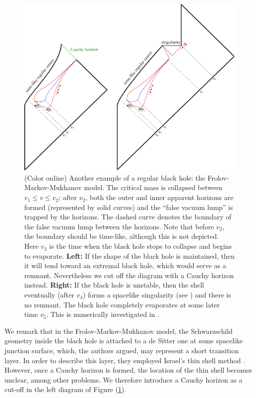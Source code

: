 \documentclass[12pt]{article}
\newcommand{\2}{$^2$}
\newcommand{\3}{$^3$}
\newcommand{\4}{$_4$}
\newcommand{\5}{$_5$}
\begin{document}
\begin{figure}
\begin{center}
\includegraphics[scale=0.48]{regular_3-eps-converted-to.pdf}
\caption{ \label{fig:regular} (Color online) Another example of a regular black hole: the Frolov-Markov-Mukhanov model. The critical mass is collapsed between $v_{1} \leqslant v \leqslant v_{2}$; after $v_{2}$, both the outer and inner apparent horizons are formed (represented by solid curves) and the ``false vacuum lump'' is trapped by the horizons. The dashed curve denotes the boundary of the false vacuum lump between the  horizons. Note that before $v_{2}$, the boundary should be time-like, although this is not depicted.  Here $v_{3}$ is the time when the black hole stops to collapse and begins to evaporate. \textbf{Left:} If the shape of the black hole is maintained, then it will tend toward an extremal black hole, which would serve as a remnant. Nevertheless we cut off the diagram with a Cauchy horizon instead. \textbf{Right:} If the black hole is unstable, then the shell eventually (after $v_{4}$) forms a spacelike singularity (see \cite{Yeom:2008qw1}) and there is no remnant. The black hole completely evaporates at some later time $v_5$. This is numerically investigated in \cite{Hwang:2012nn}.}
\end{center}
\end{figure}


We remark that in the Frolov-Markov-Mukhanov model, the Schwarzschild geometry inside the black hole is attached to a de Sitter one at some spacelike junction surface, which, the authors argued, may represent a short transition layer. In order to describe this layer, they employed Israel's thin shell method \cite{Israel}. However, once a Cauchy horizon is formed, the location of the thin shell becomes unclear, among other problems. We therefore introduce a Cauchy horizon as a cut-off in the left diagram of Figure (\ref{fig:regular}). 
\end{document}
